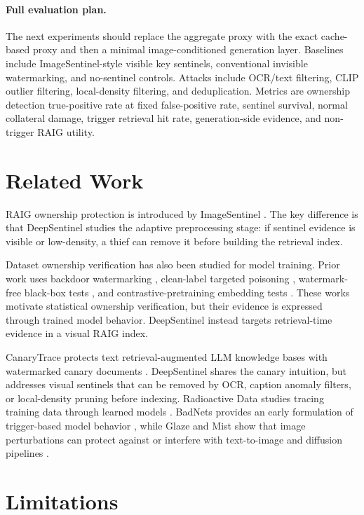 \documentclass[letterpaper]{article}
\begin{document}
\paragraph{Full evaluation plan.}
The next experiments should replace the aggregate proxy with the exact
cache-based proxy and then a minimal image-conditioned generation layer.
Baselines include ImageSentinel-style visible key sentinels, conventional
invisible watermarking, and no-sentinel controls. Attacks include OCR/text
filtering, CLIP outlier filtering, local-density filtering, and deduplication.
Metrics are ownership detection true-positive rate at fixed false-positive
rate, sentinel survival, normal collateral damage, trigger retrieval hit rate,
generation-side evidence, and non-trigger RAIG utility.

\section{Related Work}

RAIG ownership protection is introduced by ImageSentinel
\cite{imagesentinel2025}. The key difference is that DeepSentinel studies the
adaptive preprocessing stage: if sentinel evidence is visible or
low-density, a thief can remove it before building the retrieval index.

Dataset ownership verification has also been studied for model training. Prior
work uses backdoor watermarking \cite{li2023blackboxdov}, clean-label targeted
poisoning \cite{datataggants2025}, watermark-free black-box tests
\cite{zeromark2024}, and contrastive-pretraining embedding tests
\cite{dovcontrastive2025}. These works motivate statistical ownership
verification, but their evidence is expressed through trained model behavior.
DeepSentinel instead targets retrieval-time evidence in a visual RAIG index.

CanaryTrace protects text retrieval-augmented LLM knowledge bases with
watermarked canary documents \cite{canarytrace2026}. DeepSentinel shares the
canary intuition, but addresses visual sentinels that can be removed by OCR,
caption anomaly filters, or local-density pruning before indexing. Radioactive
Data studies tracing training data through learned models \cite{radioactive2020}.
BadNets provides an early formulation of trigger-based model behavior
\cite{badnets2017}, while Glaze and Mist show that image perturbations can
protect against or interfere with text-to-image and diffusion pipelines
\cite{glaze2023,mist2023}.

\section{Limitations}
\end{document}
